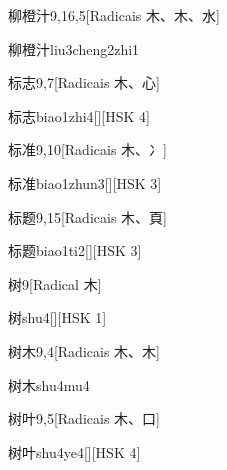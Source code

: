 \begin{entry}{柳橙汁}{9,16,5}[Radicais ⽊、⽊、⽔]
  \begin{phonetics}{柳橙汁}{liu3cheng2zhi1}
  \end{phonetics}
\end{entry}

\begin{entry}{标志}{9,7}[Radicais ⽊、⼼]
  \begin{phonetics}{标志}{biao1zhi4}[][HSK 4]
  \end{phonetics}
\end{entry}

\begin{entry}{标准}{9,10}[Radicais ⽊、⼎]
  \begin{phonetics}{标准}{biao1zhun3}[][HSK 3]
  \end{phonetics}
\end{entry}

\begin{entry}{标题}{9,15}[Radicais ⽊、⾴]
  \begin{phonetics}{标题}{biao1ti2}[][HSK 3]
  \end{phonetics}
\end{entry}

\begin{entry}{树}{9}[Radical ⽊]
  \begin{phonetics}{树}{shu4}[][HSK 1]
  \end{phonetics}
\end{entry}

\begin{entry}{树木}{9,4}[Radicais ⽊、⽊]
  \begin{phonetics}{树木}{shu4mu4}
  \end{phonetics}
\end{entry}

\begin{entry}{树叶}{9,5}[Radicais ⽊、⼝]
  \begin{phonetics}{树叶}{shu4ye4}[][HSK 4]
  \end{phonetics}
\end{entry}


